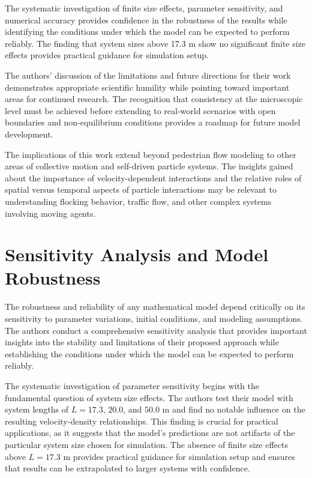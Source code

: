 \documentclass[12pt,a4paper]{article}
\begin{document}
The systematic investigation of finite size effects, parameter sensitivity, and numerical accuracy provides confidence in the robustness of the results while identifying the conditions under which the model can be expected to perform reliably. The finding that system sizes above 17.3 m show no significant finite size effects provides practical guidance for simulation setup.

The authors' discussion of the limitations and future directions for their work demonstrates appropriate scientific humility while pointing toward important areas for continued research. The recognition that consistency at the microscopic level must be achieved before extending to real-world scenarios with open boundaries and non-equilibrium conditions provides a roadmap for future model development.

The implications of this work extend beyond pedestrian flow modeling to other areas of collective motion and self-driven particle systems. The insights gained about the importance of velocity-dependent interactions and the relative roles of spatial versus temporal aspects of particle interactions may be relevant to understanding flocking behavior, traffic flow, and other complex systems involving moving agents.

\section{Sensitivity Analysis and Model Robustness}

The robustness and reliability of any mathematical model depend critically on its sensitivity to parameter variations, initial conditions, and modeling assumptions. The authors conduct a comprehensive sensitivity analysis that provides important insights into the stability and limitations of their proposed approach while establishing the conditions under which the model can be expected to perform reliably.

The systematic investigation of parameter sensitivity begins with the fundamental question of system size effects. The authors test their model with system lengths of $L = 17.3$, $20.0$, and $50.0$ m and find no notable influence on the resulting velocity-density relationships. This finding is crucial for practical applications, as it suggests that the model's predictions are not artifacts of the particular system size chosen for simulation. The absence of finite size effects above $L = 17.3$ m provides practical guidance for simulation setup and ensures that results can be extrapolated to larger systems with confidence.
\end{document}
